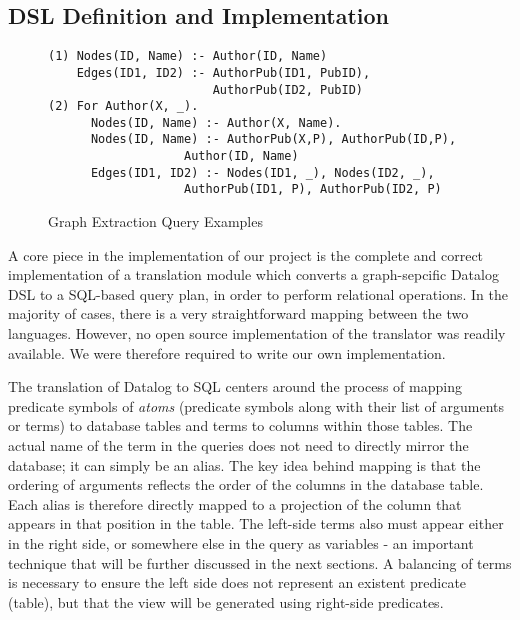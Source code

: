 \documentclass[11pt,letterpaper]{article}
\begin{document}
\subsection*{DSL Definition and Implementation}

\begin{figure}[t]
\centering
\scriptsize
\begin{lstlisting}[breaklines,basicstyle=\ttfamily]
(1) Nodes(ID, Name) :- Author(ID, Name)
    Edges(ID1, ID2) :- AuthorPub(ID1, PubID),
                       AuthorPub(ID2, PubID)
(2) For Author(X, _).
      Nodes(ID, Name) :- Author(X, Name).
      Nodes(ID, Name) :- AuthorPub(X,P), AuthorPub(ID,P),
                   Author(ID, Name)
      Edges(ID1, ID2) :- Nodes(ID1, _), Nodes(ID2, _),
                   AuthorPub(ID1, P), AuthorPub(ID2, P)
\end{lstlisting}
\vspace{-10pt}
\caption{Graph Extraction Query Examples}
\vspace{-10pt}
\label{fig:queries}
\end{figure}

A core piece in the implementation of our project is the complete and correct implementation of a translation module which converts a graph-sepcific Datalog DSL to a SQL-based query plan, in order to perform relational operations. In the majority of cases, there is a very straightforward mapping between the two languages. However, no open source implementation of the translator was readily available. We were therefore required to write our own implementation.

The translation of Datalog to SQL centers around the process of mapping predicate symbols of \textit{atoms} (predicate symbols along with their list of arguments or terms) to database tables and terms to columns within those tables. The actual name of the term in the queries does not need to directly mirror the database; it can simply be an alias. The key idea behind mapping is that the ordering of arguments reflects the order of the columns in the database table. Each alias is therefore directly mapped to a projection of the column that appears in that position in the table. The left-side terms also must appear either in the right side, or somewhere else in the query as variables - an important technique that will be further discussed in the next sections. A balancing of terms is necessary to ensure the left side does not represent an existent predicate (table), but that the view will be generated using right-side predicates.
\end{document}
